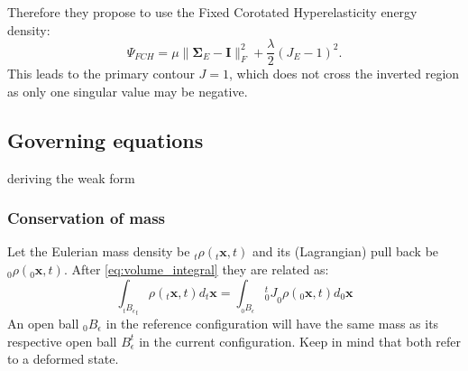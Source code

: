 \documentclass[m,times]{cgMA}
\begin{document}
Therefore they propose to use the Fixed Corotated Hyperelasticity energy density:
\begin{equation}
  \Psi_{FCH} = \mu \|\boldsymbol{\Sigma}_E - \boldsymbol{I}\|^2_F + \frac{\lambda}{2}(J_E-1)^2.
\end{equation}
This leads to the primary contour $J=1$, which does not cross the inverted region as only one singular value may be negative.
\cite{MPM:INVERT}
\subsection{Governing equations}
deriving the weak form
\subsubsection{Conservation of mass}
Let the Eulerian mass density be $_t\rho(_t\boldsymbol{x},t)$ and its (Lagrangian) pull back be $_0\rho(_0\boldsymbol{x},t)$.
After \ref{eq:volume_integral} they are related as:
\begin{equation} \label{eq:density_pull_back}
  \int _ {_tB _ { \epsilon }}_t\rho(_t\boldsymbol{x},t)d_t\boldsymbol{x} =   \int _ {_0B _ { \epsilon }} {^t_0J}_0\rho(_0\boldsymbol{x},t) d_0\boldsymbol{x}
\end{equation}
An open ball $ _ { 0 }B _ { \epsilon } $ in the reference configuration will have the same mass as its respective open ball $B_{\epsilon}^t$ in the current configuration. Keep in mind that both refer to a deformed state.
\end{document}
